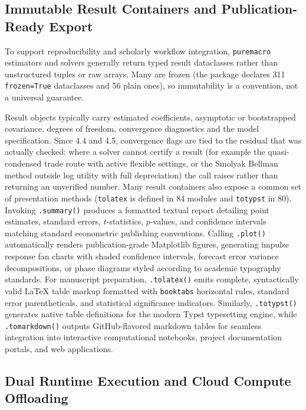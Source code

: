 \documentclass[11pt,letterpaper]{article}
\renewcommand{\_}{\pmunderscore\allowbreak}
\begin{document}
\subsection{Immutable Result Containers and Publication-Ready Export}\label{immutable-result-containers-and-publication-ready-export}

To support reproducibility and scholarly workflow integration, \texttt{puremacro} estimators and solvers generally return typed result dataclasses rather than unstructured tuples or raw arrays. Many are frozen (the package declares 311 \texttt{frozen=True} dataclasses and 56 plain ones), so immutability is a convention, not a universal guarantee.

Result objects typically carry estimated coefficients, asymptotic or bootstrapped covariance, degrees of freedom, convergence diagnostics and the model specification. Since 4.4 and 4.5, convergence flags are tied to the residual that was actually checked: where a solver cannot certify a result (for example the quasi-condensed trade route with active flexible settings, or the Smolyak Bellman method outside log utility with full depreciation) the call raises rather than returning an unverified number. Many result containers also expose a common set of presentation methods (\texttt{to\_latex} is defined in 84 modules and \texttt{to\_typst} in 80). Invoking \texttt{.summary()} produces a formatted textual report detailing point estimates, standard errors, \(t\)-statistics, \(p\)-values, and confidence intervals matching standard econometric publishing conventions. Calling \texttt{.plot()} automatically renders publication-grade Matplotlib figures, generating impulse response fan charts with shaded confidence intervals, forecast error variance decompositions, or phase diagrams styled according to academic typography standards. For manuscript preparation, \texttt{.to\_latex()} emits complete, syntactically valid LaTeX table markup formatted with \texttt{booktabs} horizontal rules, standard error parentheticals, and statistical significance indicators. Similarly, \texttt{.to\_typst()} generates native table definitions for the modern Typst typesetting engine, while \texttt{.to\_markdown()} outputs GitHub-flavored markdown tables for seamless integration into interactive computational notebooks, project documentation portals, and web applications.

\subsection{Dual Runtime Execution and Cloud Compute Offloading}\label{dual-runtime-execution-and-cloud-compute-offloading}
\end{document}
